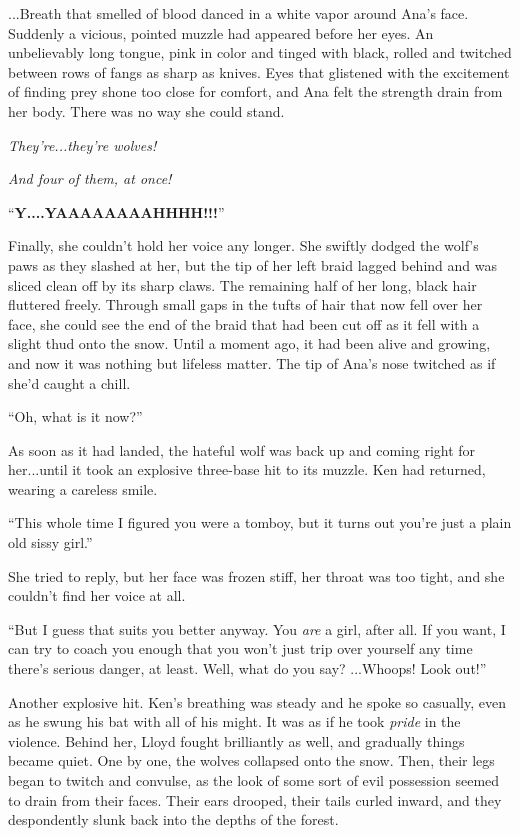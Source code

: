 \documentclass[
]{article}
\begin{document}
...Breath that smelled of blood danced in a white vapor around Ana's
face. Suddenly a vicious, pointed muzzle had appeared before her eyes.
An unbelievably long tongue, pink in color and tinged with black, rolled
and twitched between rows of fangs as sharp as knives. Eyes that
glistened with the excitement of finding prey shone too close for
comfort, and Ana felt the strength drain from her body. There was no way
she could stand.

\emph{They're...they're wolves!}

\emph{And four of them, at once!}

``\textbf{Y....YAAAAAAAAHHHH!!!}''

Finally, she couldn't hold her voice any longer. She swiftly dodged the
wolf's paws as they slashed at her, but the tip of her left braid lagged
behind and was sliced clean off by its sharp claws. The remaining half
of her long, black hair fluttered freely. Through small gaps in the
tufts of hair that now fell over her face, she could see the end of the
braid that had been cut off as it fell with a slight thud onto the snow.
Until a moment ago, it had been alive and growing, and now it was
nothing but lifeless matter. The tip of Ana's nose twitched as if she'd
caught a chill.

``Oh, what is it now?''

As soon as it had landed, the hateful wolf was back up and coming right
for her...until it took an explosive three-base hit to its muzzle. Ken
had returned, wearing a careless smile.

``This whole time I figured you were a tomboy, but it turns out you're
just a plain old sissy girl.''

She tried to reply, but her face was frozen stiff, her throat was too
tight, and she couldn't find her voice at all.

``But I guess that suits you better anyway. You \emph{are} a girl, after
all. If you want, I can try to coach you enough that you won't just trip
over yourself any time there's serious danger, at least. Well, what do
you say? ...Whoops! Look out!''

Another explosive hit. Ken's breathing was steady and he spoke so
casually, even as he swung his bat with all of his might. It was as if
he took \emph{pride} in the violence. Behind her, Lloyd fought
brilliantly as well, and gradually things became quiet. One by one, the
wolves collapsed onto the snow. Then, their legs began to twitch and
convulse, as the look of some sort of evil possession seemed to drain
from their faces. Their ears drooped, their tails curled inward, and
they despondently slunk back into the depths of the forest.
\end{document}
